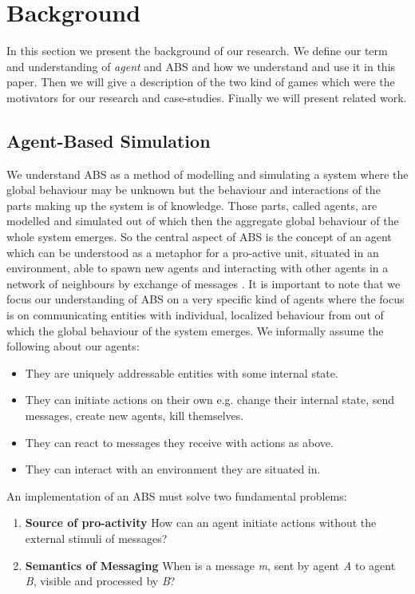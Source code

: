 \section{Background}
In this section we present the background of our research. We define our term and understanding of \textit{agent} and ABS and how we understand and use it in this paper. Then we will give a description of the two kind of games which were the motivators for our research and case-studies. Finally we will present related work.

\subsection{Agent-Based Simulation}
We understand ABS as a method of modelling and simulating a system where the global behaviour may be unknown but the behaviour and interactions of the parts making up the system is of knowledge. Those parts, called agents, are modelled and simulated out of which then the aggregate global behaviour of the whole system emerges. So the central aspect of ABS is the concept of an agent which can be understood as a metaphor for a pro-active unit, situated in an environment, able to spawn new agents and interacting with other agents in a network of neighbours by exchange of messages \cite{wooldridge_introduction_2009}. It is important to note that we focus our understanding of ABS on a very specific kind of agents where the focus is on communicating entities with individual, localized behaviour from out of which the global behaviour of the system emerges. We informally assume the following about our agents:

\begin{itemize}
	\item They are uniquely addressable entities with some internal state.
	\item They can initiate actions on their own e.g. change their internal state, send messages, create new agents, kill themselves.
	\item They can react to messages they receive with actions as above.
	\item They can interact with an environment they are situated in.
\end{itemize} 

An implementation of an ABS must solve two fundamental problems:

\begin{enumerate}
	\item \textbf{Source of pro-activity} How can an agent initiate actions without the external stimuli of messages?
	\item \textbf{Semantics of Messaging} When is a message \textit{m}, sent by agent \textit{A} to agent \textit{B}, visible and processed by \textit{B}?
\end{enumerate}

